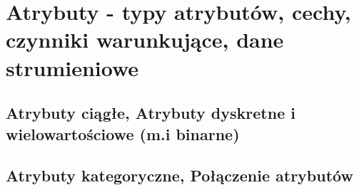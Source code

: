 \section{Atrybuty - typy atrybutów, cechy, czynniki warunkujące, dane strumieniowe}
\subsection{Atrybuty ciągłe, Atrybuty dyskretne i wielowartościowe (m.i binarne)}
\subsection{Atrybuty kategoryczne, Połączenie atrybutów}